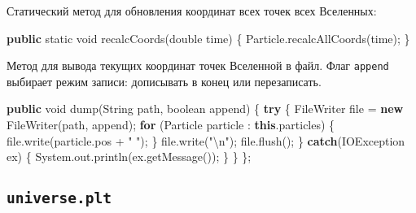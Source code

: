 \documentclass[
  12pt,
  a4paper,
]{article}
\newenvironment{Shaded}{}{}
\newcommand{\BuiltInTok}[1]{#1}
\newcommand{\ControlFlowTok}[1]{\textcolor[rgb]{0.00,0.44,0.13}{\textbf{#1}}}
\newcommand{\DataTypeTok}[1]{\textcolor[rgb]{0.56,0.13,0.00}{#1}}
\newcommand{\FunctionTok}[1]{\textcolor[rgb]{0.02,0.16,0.49}{#1}}
\newcommand{\KeywordTok}[1]{\textcolor[rgb]{0.00,0.44,0.13}{\textbf{#1}}}
\newcommand{\NormalTok}[1]{#1}
\newcommand{\OperatorTok}[1]{\textcolor[rgb]{0.40,0.40,0.40}{#1}}
\newcommand{\SpecialCharTok}[1]{\textcolor[rgb]{0.25,0.44,0.63}{#1}}
\newcommand{\StringTok}[1]{\textcolor[rgb]{0.25,0.44,0.63}{#1}}
\begin{document}
Статический метод для обновления координат всех точек всех Вселенных:

\begin{Shaded}
\begin{Highlighting}[]
\KeywordTok{public} \DataTypeTok{static} \DataTypeTok{void} \FunctionTok{recalcCoords}\OperatorTok{(}\DataTypeTok{double}\NormalTok{ time}\OperatorTok{)} \OperatorTok{\{}
\NormalTok{    Particle}\OperatorTok{.}\FunctionTok{recalcAllCoords}\OperatorTok{(}\NormalTok{time}\OperatorTok{);}
\OperatorTok{\}}
\end{Highlighting}
\end{Shaded}

Метод для вывода текущих координат точек Вселенной в файл. Флаг
\texttt{append} выбирает режим записи: дописывать в конец или
перезаписать.

\begin{Shaded}
\begin{Highlighting}[]
    \KeywordTok{public} \DataTypeTok{void} \FunctionTok{dump}\OperatorTok{(}\BuiltInTok{String}\NormalTok{ path}\OperatorTok{,} \DataTypeTok{boolean}\NormalTok{ append}\OperatorTok{)} \OperatorTok{\{}
        \ControlFlowTok{try} \OperatorTok{\{}
            \BuiltInTok{FileWriter}\NormalTok{ file }\OperatorTok{=} \KeywordTok{new} \BuiltInTok{FileWriter}\OperatorTok{(}\NormalTok{path}\OperatorTok{,}\NormalTok{ append}\OperatorTok{);}
            \ControlFlowTok{for} \OperatorTok{(}\NormalTok{Particle particle }\OperatorTok{:} \KeywordTok{this}\OperatorTok{.}\FunctionTok{particles}\OperatorTok{)} \OperatorTok{\{}
\NormalTok{                file}\OperatorTok{.}\FunctionTok{write}\OperatorTok{(}\NormalTok{particle}\OperatorTok{.}\FunctionTok{pos} \OperatorTok{+} \StringTok{" "}\OperatorTok{);}
            \OperatorTok{\}}
\NormalTok{            file}\OperatorTok{.}\FunctionTok{write}\OperatorTok{(}\StringTok{"}\SpecialCharTok{\textbackslash{}n}\StringTok{"}\OperatorTok{);}
\NormalTok{            file}\OperatorTok{.}\FunctionTok{flush}\OperatorTok{();}
        \OperatorTok{\}}
        \ControlFlowTok{catch}\OperatorTok{(}\BuiltInTok{IOException}\NormalTok{ ex}\OperatorTok{)} \OperatorTok{\{}
            \BuiltInTok{System}\OperatorTok{.}\FunctionTok{out}\OperatorTok{.}\FunctionTok{println}\OperatorTok{(}\NormalTok{ex}\OperatorTok{.}\FunctionTok{getMessage}\OperatorTok{());}
        \OperatorTok{\}}
    \OperatorTok{\}}
\OperatorTok{\};}
\end{Highlighting}
\end{Shaded}

\hypertarget{universe.plt}{%
\subsection{\texorpdfstring{\texttt{universe.plt}}{universe.plt}}\label{universe.plt}}
\end{document}
